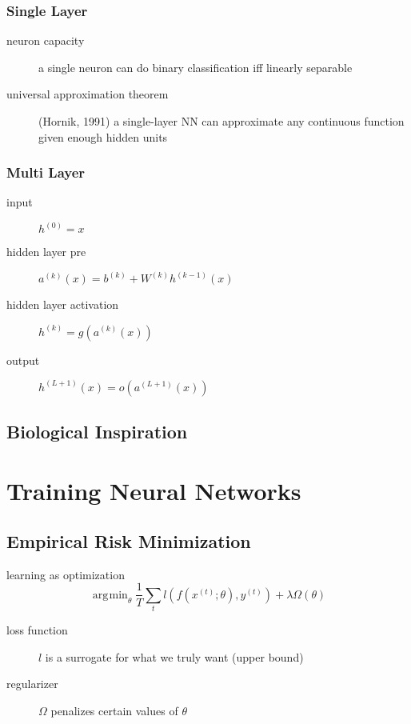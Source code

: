 \documentclass[]{article}
\DeclareMathOperator*{\argmin}{\arg\!\min}
\begin{document}
\subsubsection{Single Layer}%
\label{ssub:single_layer}

\begin{description}
    \item[neuron capacity] a single neuron can do binary classification iff linearly separable
    \item[universal approximation theorem] (Hornik, 1991)
        a single-layer NN can approximate any continuous function given enough hidden units
\end{description}

\subsubsection{Multi Layer}%
\label{ssub:multi_layer}

\begin{description}
    \item[input] $h^{(0)} = x$
    \item[hidden layer pre] $a^{(k)} (x) = b^{(k)} + W^{(k)} h^{(k-1)}(x)$
    \item[hidden layer activation] $h^{(k)} = g(a^{(k)}(x))$
    \item[output] $h^{(L+1)}(x) = o(a^{(L+1)}(x))$
\end{description}

\subsection{Biological Inspiration}%
\label{sub:biological_inspiration}


\section{Training Neural Networks}%
\label{sec:training_neural_networks}

\subsection{Empirical Risk Minimization}%
\label{sub:empirical_risk_minimization}
learning as optimization
\begin{equation*}
    \argmin_\theta \frac{1}{T} \sum_t l(f(x^{(t)};\theta), y^{(t)}) + \lambda \Omega(\theta)
\end{equation*}

\begin{description}
    \item[loss function] $l$ is a surrogate for what we truly want (upper bound)
    \item[regularizer] $\Omega$ penalizes certain values of $\theta$
\end{description}
\end{document}
